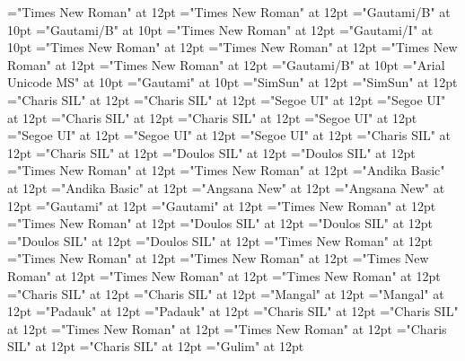 \documentclass[c5paper,twoside]{article}
\begin{document}
\font\xitemxitemLexEntryTypepublishStemEntryTypeAbbreviationPubbefore="Times New Roman" at 12pt
\font\xitemxitemLexEntryTypepublishStemComplexFormTypeReverseAbbrPubbefore="Times New Roman" at 12pt
\font\xitemxitemLexEntrypublishStemComponentTargetHeadWordRefbefore="Gautami/B" at 10pt
\font\xitemxitemheadwordbefore="Gautami/B" at 10pt
\font\xitemxitemexamplesbefore="Times New Roman" at 12pt
\font\xitemxitemexamplebefore="Gautami/I" at 10pt
\font\xitemxitementryreftypebefore="Times New Roman" at 12pt
\font\xitemxitementryrefcomponentbefore="Times New Roman" at 12pt
\font\xitemxitemdefinitionbefore="Times New Roman" at 12pt
\font\xitemxitemcomplexformrefsbefore="Times New Roman" at 12pt
\font\xitemxitemcomplexformformbefore="Gautami/B" at 10pt
\font\xitemhi="Arial Unicode MS" at 10pt
\font\xitemte="Gautami" at 10pt
\font\spanzhCN="SimSun" at 12pt
\font\divzhCN="SimSun" at 12pt
\font\spanvi="Charis SIL" at 12pt
\font\divvi="Charis SIL" at 12pt
\font\spantsi="Segoe UI" at 12pt
\font\divtsi="Segoe UI" at 12pt
\font\spantsiZxxxxaudio="Charis SIL" at 12pt
\font\divtsiZxxxxaudio="Charis SIL" at 12pt
\font\spantsixstr="Segoe UI" at 12pt
\font\divtsixstr="Segoe UI" at 12pt
\font\spantsifonipa="Segoe UI" at 12pt
\font\divtsifonipa="Segoe UI" at 12pt
\font\spantr="Charis SIL" at 12pt
\font\divtr="Charis SIL" at 12pt
\font\spantrfonipa="Doulos SIL" at 12pt
\font\divtrfonipa="Doulos SIL" at 12pt
\font\spantrfonipaxemic="Times New Roman" at 12pt
\font\divtrfonipaxemic="Times New Roman" at 12pt
\font\spantpi="Andika Basic" at 12pt
\font\divtpi="Andika Basic" at 12pt
\font\spanth="Angsana New" at 12pt
\font\divth="Angsana New" at 12pt
\font\spante="Gautami" at 12pt
\font\divte="Gautami" at 12pt
\font\spanswc="Times New Roman" at 12pt
\font\divswc="Times New Roman" at 12pt
\font\spanseh="Doulos SIL" at 12pt
\font\divseh="Doulos SIL" at 12pt
\font\spansehfonipaxetic="Doulos SIL" at 12pt
\font\divsehfonipaxetic="Doulos SIL" at 12pt
\font\spanru="Times New Roman" at 12pt
\font\divru="Times New Roman" at 12pt
\font\spanqaaxlel="Times New Roman" at 12pt
\font\divqaaxlel="Times New Roman" at 12pt
\font\spanpt="Times New Roman" at 12pt
\font\divpt="Times New Roman" at 12pt
\font\spannko="Charis SIL" at 12pt
\font\divnko="Charis SIL" at 12pt
\font\spanne="Mangal" at 12pt
\font\divne="Mangal" at 12pt
\font\spanmy="Padauk" at 12pt
\font\divmy="Padauk" at 12pt
\font\spanms="Charis SIL" at 12pt
\font\divms="Charis SIL" at 12pt
\font\spanlv="Times New Roman" at 12pt
\font\divlv="Times New Roman" at 12pt
\font\spankup="Charis SIL" at 12pt
\font\divkup="Charis SIL" at 12pt
\font\spanko="Gulim" at 12pt
\end{document}
